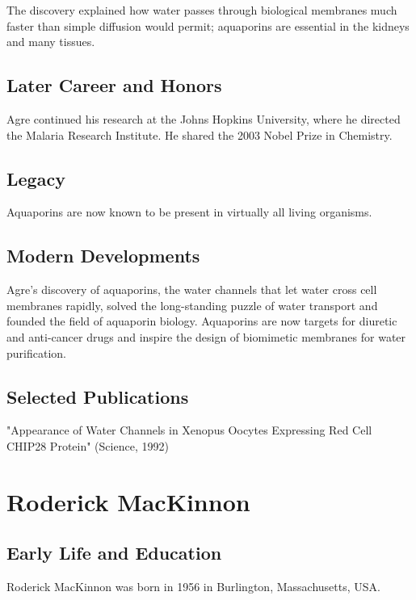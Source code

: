 The discovery explained how water passes through biological membranes much faster than simple diffusion would permit; aquaporins are essential in the kidneys and many tissues.

\subsection*{Later Career and Honors}

Agre continued his research at the Johns Hopkins University, where he directed the Malaria Research Institute. He shared the 2003 Nobel Prize in Chemistry.

\subsection*{Legacy}

Aquaporins are now known to be present in virtually all living organisms.

\subsection*{Modern Developments}

Agre's discovery of aquaporins, the water channels that let water cross cell membranes rapidly, solved the long-standing puzzle of water transport and founded the field of aquaporin biology. Aquaporins are now targets for diuretic and anti-cancer drugs and inspire the design of biomimetic membranes for water purification.

\subsection*{Selected Publications}

"Appearance of Water Channels in Xenopus Oocytes Expressing Red Cell CHIP28 Protein" (Science, 1992)

\clearpage

\section{Roderick MacKinnon}

\subsection*{Early Life and Education}

Roderick MacKinnon was born in 1956 in Burlington, Massachusetts, USA.


